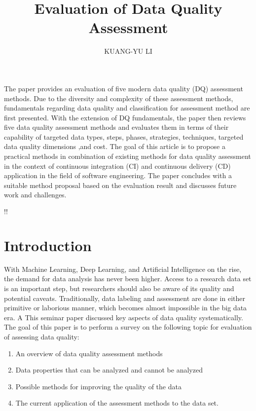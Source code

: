 \documentclass[pdftex,english,oribibl]{llncs}
\title{Evaluation of Data Quality Assessment}
\author{KUANG-YU LI}
\institute{University of Stuttgart\\Master Student in Information Technology \\70569 Stuttgart, Germany}
\makeatletter
\gdef\@keywords{}
\renewenvironment{abstract}{%
  \list{}{\advance\topsep by0.35cm\relax\small%
          \leftmargin=1cm%
          \labelwidth=\z@%
          \listparindent=\z@%
          \itemindent\listparindent%
          \rightmargin\leftmargin}%
          \item[\hskip\labelsep\bfseries\abstractname]}{%
  \if!\@keywords!\else{\item[~]\item[\hskip\labelsep\bfseries\keywordname]\@keywords}\fi%
  \endlist}
\makeatother
\begin{document}
\maketitle

\begin{abstract}
   The paper provides an evaluation of five modern data quality (DQ) assessment methods. Due to the diversity and complexity of these assessment methods, fundamentals regarding data quality and classification for assessment method are first presented. With the extension of DQ fundamentals, the paper then reviews five data quality assessment methods and evaluates them in terms of their capability of targeted data types, steps, phases, strategies, techniques, targeted data quality dimensions ,and cost. The goal of this article is to propose a practical methods in combination of existing methods for data quality assessment in the context of  continuous integration (CI) and  continuous delivery (CD) application in the field of software engineering. The paper concludes with a suitable method proposal based on the evaluation result and discusses future work and challenges.

\end{abstract}
\section{Introduction}
With Machine Learning, Deep Learning, and Artificial Intelligence on the rise, the demand for data analysis has never been higher.
Access to a research data set is an important step, but researchers should also be aware of its quality and potential caveats. Traditionally, data labeling and assessment are done in either primitive or laborious manner, which becomes almost impossible in the big data era. A
This seminar paper discussed key aspects of data quality systematically.
The goal of this paper is to perform a survey on the following topic for evaluation of assessing data quality:
\begin{enumerate}
    \item An overview of data quality assessment methods
    \item Data properties that can be analyzed and cannot be analyzed
    \item Possible methods for improving the quality of the data
    \item The current application of the assessment methods to the data set.
\end{enumerate}
\end{document}
